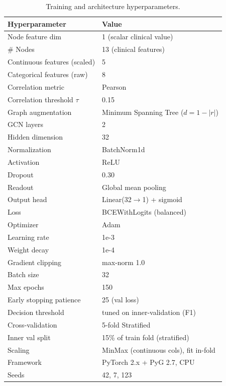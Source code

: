 \begin{table}[t]
\centering
\caption{Training and architecture hyperparameters.}
\label{tab:hyperparams}
\small
\begin{tabular}{p{3.1cm}p{4.6cm}}
\toprule
Hyperparameter & Value \\
\midrule
Node feature dim & 1 (scalar clinical value) \\
\# Nodes & 13 (clinical features) \\
Continuous features (scaled) & 5 \\
Categorical features (raw) & 8 \\
Correlation metric & Pearson \\
Correlation threshold $\tau$ & 0.15 \\
Graph augmentation & Minimum Spanning Tree ($d = 1 - |r|$) \\
GCN layers & 2 \\
Hidden dimension & 32 \\
Normalization & BatchNorm1d \\
Activation & ReLU \\
Dropout & 0.30 \\
Readout & Global mean pooling \\
Output head & Linear(32$\to$1) + sigmoid \\
Loss & BCEWithLogits (balanced) \\
Optimizer & Adam \\
Learning rate & 1e-3 \\
Weight decay & 1e-4 \\
Gradient clipping & max-norm 1.0 \\
Batch size & 32 \\
Max epochs & 150 \\
Early stopping patience & 25 (val loss) \\
Decision threshold & tuned on inner-validation (F1) \\
Cross-validation & 5-fold Stratified \\
Inner val split & 15\% of train fold (stratified) \\
Scaling & MinMax (continuous cols), fit in-fold \\
Framework & PyTorch 2.x + PyG 2.7, CPU \\
Seeds & 42, 7, 123 \\
\bottomrule
\end{tabular}
\end{table}
